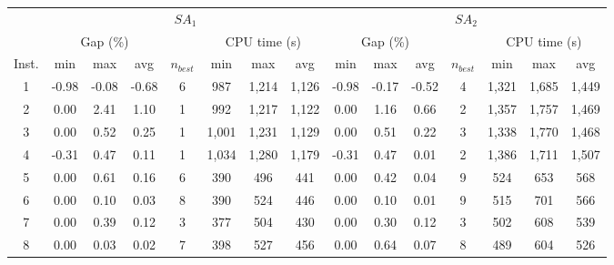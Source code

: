 \documentclass[11pt]{article}
\begin{document}
\begin{table}[H]
    \centering
    \scriptsize
\begin{tabular}{ccccccccccccccc}
\toprule
 & \multicolumn{7}{c}{$SA_1$} & \multicolumn{7}{c}{$SA_2$} \\ \cline{3-7} \cline{10-14}
 & \multicolumn{3}{c}{Gap (\%)} &  & \multicolumn{3}{c}{CPU time (s)} & \multicolumn{3}{c}{Gap (\%)} &  & \multicolumn{3}{c}{CPU time (s)} \\ \cline{2-4} \cline{6-8}  \cline{9-11} \cline{13-15} 
Inst. & min & max & avg & $n_{best}$ & min & max & avg & min & max & avg & $n_{best}$ & min & max & avg \\ \hline
\multicolumn{1}{c|}{1} & -0.98 & -0.08 & \multicolumn{1}{c|}{-0.68} & \multicolumn{1}{c|}{6} & 987 & 1,214 & \multicolumn{1}{c|}{1,126} & -0.98 & -0.17 & \multicolumn{1}{c|}{-0.52} & \multicolumn{1}{c|}{4} & 1,321 & 1,685 & 1,449 \\
\multicolumn{1}{c|}{2} & 0.00 & 2.41 & \multicolumn{1}{c|}{1.10} & \multicolumn{1}{c|}{1} & 992 & 1,217 & \multicolumn{1}{c|}{1,122} & 0.00 & 1.16 & \multicolumn{1}{c|}{0.66} & \multicolumn{1}{c|}{2} & 1,357 & 1,757 & 1,469 \\
\multicolumn{1}{c|}{3} & 0.00 & 0.52 & \multicolumn{1}{c|}{0.25} & \multicolumn{1}{c|}{1} & 1,001 & 1,231 & \multicolumn{1}{c|}{1,129} & 0.00 & 0.51 & \multicolumn{1}{c|}{0.22} & \multicolumn{1}{c|}{3} & 1,338 & 1,770 & 1,468 \\
\multicolumn{1}{c|}{4} & -0.31 & 0.47 & \multicolumn{1}{c|}{0.11} & \multicolumn{1}{c|}{1} & 1,034 & 1,280 & \multicolumn{1}{c|}{1,179} & -0.31 & 0.47 & \multicolumn{1}{c|}{0.01} & \multicolumn{1}{c|}{2} & 1,386 & 1,711 & 1,507 \\ \hline
\multicolumn{1}{c|}{5} & 0.00 & 0.61 & \multicolumn{1}{c|}{0.16} & \multicolumn{1}{c|}{6} & 390 & 496 & \multicolumn{1}{c|}{441} & 0.00 & 0.42 & \multicolumn{1}{c|}{0.04} & \multicolumn{1}{c|}{9} & 524 & 653 & 568 \\
\multicolumn{1}{c|}{6} & 0.00 & 0.10 & \multicolumn{1}{c|}{0.03} & \multicolumn{1}{c|}{8} & 390 & 524 & \multicolumn{1}{c|}{446} & 0.00 & 0.10 & \multicolumn{1}{c|}{0.01} & \multicolumn{1}{c|}{9} & 515 & 701 & 566 \\
\multicolumn{1}{c|}{7} & 0.00 & 0.39 & \multicolumn{1}{c|}{0.12} & \multicolumn{1}{c|}{3} & 377 & 504 & \multicolumn{1}{c|}{430} & 0.00 & 0.30 & \multicolumn{1}{c|}{0.12} & \multicolumn{1}{c|}{3} & 502 & 608 & 539 \\
\multicolumn{1}{c|}{8} & 0.00 & 0.03 & \multicolumn{1}{c|}{0.02} & \multicolumn{1}{c|}{7} & 398 & 527 & \multicolumn{1}{c|}{456} & 0.00 & 0.64 & \multicolumn{1}{c|}{0.07} & \multicolumn{1}{c|}{8} & 489 & 604 & 526 \\ \hline

\end{tabular}
\end{table}
\end{document}
